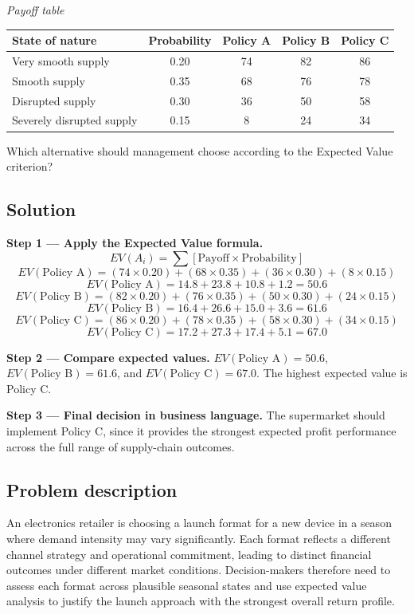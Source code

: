 \begin{ExamProblems}
		\begin{center}
			\textit{Payoff table} \par
			\begin{tabular}{l c c c c}
				\toprule
				State of nature & Probability & Policy A & Policy B & Policy C \\
				\midrule
				Very smooth supply & 0.20 & 74 & 82 & 86 \\
				Smooth supply & 0.35 & 68 & 76 & 78 \\
				Disrupted supply & 0.30 & 36 & 50 & 58 \\
				Severely disrupted supply & 0.15 & 8 & 24 & 34 \\
				\bottomrule
			\end{tabular}
		\end{center}

		Which alternative should management choose according to the Expected Value criterion?

		\subsection*{Solution}
		\textbf{Step 1 --- Apply the Expected Value formula.}
		\[
		EV(A_i)=\sum [\text{Payoff}\times\text{Probability}]
		\]
		\[
		EV(\text{Policy A})=(74\times0.20)+(68\times0.35)+(36\times0.30)+(8\times0.15)
		\]
		\[
		EV(\text{Policy A})=14.8+23.8+10.8+1.2=50.6
		\]
		\[
		EV(\text{Policy B})=(82\times0.20)+(76\times0.35)+(50\times0.30)+(24\times0.15)
		\]
		\[
		EV(\text{Policy B})=16.4+26.6+15.0+3.6=61.6
		\]
		\[
		EV(\text{Policy C})=(86\times0.20)+(78\times0.35)+(58\times0.30)+(34\times0.15)
		\]
		\[
		EV(\text{Policy C})=17.2+27.3+17.4+5.1=67.0
		\]
		
		\textbf{Step 2 --- Compare expected values.}
		$EV(\text{Policy A})=50.6$, $EV(\text{Policy B})=61.6$, and $EV(\text{Policy C})=67.0$.
		The highest expected value is Policy C.
		
		\textbf{Step 3 --- Final decision in business language.}
		The supermarket should implement Policy C, since it provides the strongest expected profit performance across the full range of supply-chain outcomes.		\item
		\subsection*{Problem description}
		An electronics retailer is choosing a launch format for a new device in a season where demand intensity may vary significantly. Each format reflects a different channel strategy and operational commitment, leading to distinct financial outcomes under different market conditions. Decision-makers therefore need to assess each format across plausible seasonal states and use expected value analysis to justify the launch approach with the strongest overall return profile.


\end{ExamProblems}
